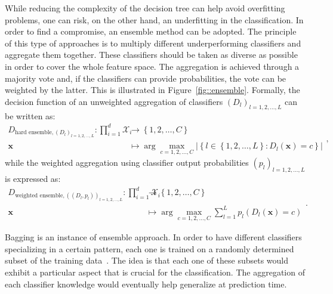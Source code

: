         While reducing the complexity of the decision tree can help avoid overfitting problems, one can risk, on the other hand, an underfitting in the classification.
        In order to find a compromise, an ensemble method can be adopted.
        The principle of this type of approaches is to multiply different underperforming classifiers and aggregate them together.
        These classifiers should be taken as diverse as possible in order to cover the whole feature space.
        The aggregation is achieved through a majority vote and, if the classifiers can provide probabilities, the vote can be weighted by the latter.
        This is illustrated in Figure~\ref{fig::ensemble}.
        Formally, the decision function of an unweighted aggregation of classifiers $\left(D_l\right)_{l = 1, 2, \dots, L}$ can be written as:
        \begin{equation}
            \label{eq::decision_function_hard_ensemble}
            \begin{aligned}
                D_{\text{hard ensemble}, \left(D_l\right)_{l = 1, 2, \dots, L}}: \prod_{i=1}^{d}\mathscr{X}_i &\rightarrow \left\{1, 2, \dots, C\right\}\\
                \bm{x} &\mapsto \arg \max_{c = 1, 2, \dots, C}\lvert\left\{l\in\left\{1, 2, \dots, L\right\}: D_l(\bm{x}) = c\right\}\rvert
            \end{aligned},
        \end{equation}
        while the weighted aggregation using classifier output probabilities $\left(p_l\right)_{l = 1, 2, \dots, L}$ is expressed as:
        \begin{equation}
            \label{eq::decision_function_weighted_ensemble}
            \begin{aligned}
                D_{\text{weighted ensemble}, \left((D_l, p_l)\right)_{l = 1, 2, \dots, L}}: \prod_{i=1}^{d}\mathscr{X}_i &\rightarrow \left\{1, 2, \dots, C\right\}\\
                \bm{x} &\mapsto \arg \max_{c = 1, 2, \dots, C} \sum_{l=1}^{L} p_l\left(D_l(\bm{x}) = c\right) 
            \end{aligned}.
        \end{equation}

        Bagging is an instance of ensemble approach.
        In order to have different classifiers specializing in a certain pattern, each one is trained on a randomly determined subset of the training data~\parencite{breiman1996bagging}.
        The idea is that each one of these subsets would exhibit a particular aspect that is crucial for the classification.
        The aggregation of each classifier knowledge would eventually help generalize at prediction time.\\

